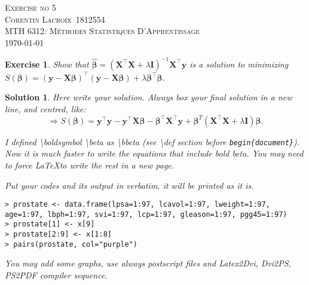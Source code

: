 \documentclass[12pt,a4paper]{article}
\def\StudentName{Corentin Lacroix}
\def\StudentMatricule{1812554}
\def\ExerciseNo{5}
\def\T{^\top} %
\def\bbeta{\boldsymbol \beta} %
\newtheorem{exercise}{Exercise}
\newtheorem{solution}{Solution}
\begin{document}
\begin{titlepage}
\begin{center}
\textsc{\LARGE Exercise no \ExerciseNo}\\[1.5cm]
\vspace{2in}
\textsc{\Large \StudentName~\StudentMatricule}\\[0.5cm]
\textsc{MTH 6312: Méthodes Statistiques D'Apprentissage}\\[0.5cm]
\today
\end{center}
\end{titlepage}


\begin{exercise}
 Show that
$\hat{\bbeta} = (\mathbf{X}\T \mathbf{X} + \lambda \mathbf{I})^{-1} \mathbf{X}\T \mathbf{y}$
is a solution to minimizing
$ S(\bbeta) = (\mathbf{y} - \mathbf{X} \bbeta)\T (\mathbf{y} - \mathbf{X} \bbeta) + \lambda \bbeta\T \bbeta$.
\end{exercise}


\begin{solution}
Here write your solution. Always box your final solution in a new line, and centred, like:
\\
$$ \Rightarrow \boxed{
 S(\bbeta) = 
\mathbf{y}\T \mathbf{y} - \mathbf{y}\T \mathbf{X} \bbeta - \bbeta\T \mathbf{X}\T \mathbf{y}
+  \bbeta^T (\mathbf{X}\T \mathbf{X} + \lambda \mathbf{I}) \bbeta.
}
$$
\vspace*{1.5cm} %

I defined \textbackslash boldsymbol \textbackslash beta as \textbackslash bbeta (see \textbackslash def section before \texttt{begin\{document\}}). Now it is much faster to write the equations that include bold beta. You may need to force \LaTeX to write the rest in a new page. \newpage %


Put your codes and its output in verbatim, it will be printed as it is. 
\begin{verbatim}
> prostate <- data.frame(lpsa=1:97, lcavol=1:97, lweight=1:97, age=1:97, lbph=1:97, svi=1:97, lcp=1:97, gleason=1:97, pgg45=1:97)
> prostate[1] <- x[9]
> prostate[2:9] <- x[1:8]
> pairs(prostate, col="purple")
\end{verbatim}
You may add some graphs, use always postscript files and Latex2Dvi, Dvi2PS, PS2PDF compiler sequence. 

\end{solution}
\end{document}
